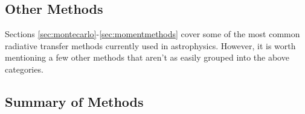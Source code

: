 \subsection{Other Methods}
\label{sec:othermethods}

Sections \ref{sec:montecarlo}-\ref{sec:momentmethods} cover some of the most common radiative transfer methods currently used in astrophysics. However, it is worth mentioning a few other methods that aren't as easily grouped into the above categories.




%
%

\subsection{Summary of Methods}
\label{sec:summaryofmethods}


%
%

